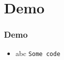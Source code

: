 \section{Demo}

\begin{frame}
    \frametitle{Demo}

    \begin{itemize}
        \item abc \footnotemark[1] \texttt{Some code}
    \end{itemize}

\end{frame}